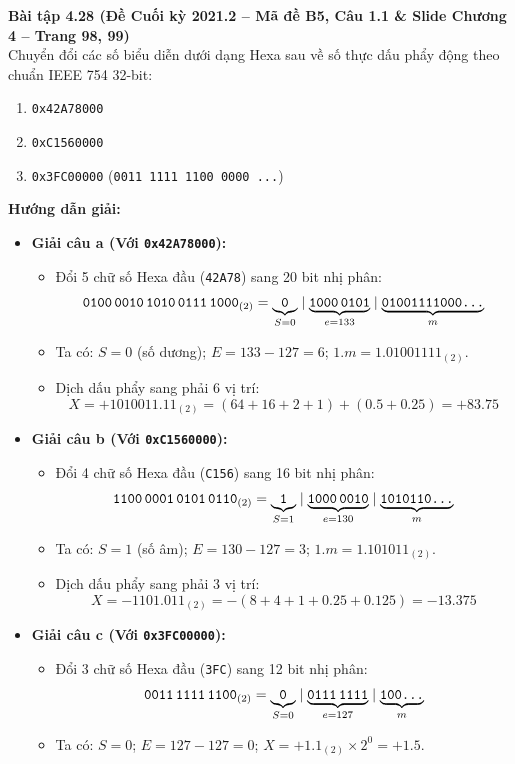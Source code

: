 \textbf{Bài tập 4.28 (Đề Cuối kỳ 2021.2 -- Mã đề B5, Câu 1.1 \& Slide Chương 4 -- Trang 98, 99)}\\
Chuyển đổi các số biểu diễn dưới dạng Hexa sau về số thực dấu phẩy động theo chuẩn IEEE 754 32-bit:
\begin{enumerate}[label=\alph*)]
    \item \texttt{0x42A78000}
    \item \texttt{0xC1560000}
    \item \texttt{0x3FC00000} (\texttt{0011 1111 1100 0000 ...})
\end{enumerate}
\textbf{Hướng dẫn giải:}
\begin{itemize}
    \item \textbf{Giải câu a (Với \texttt{0x42A78000}):}
    \begin{itemize}
        \item Đổi 5 chữ số Hexa đầu (\texttt{42A78}) sang 20 bit nhị phân:
        $$\texttt{0100\,0010\,1010\,0111\,1000}_{(2)} = \underbrace{\texttt{0}}_{S=0} \mid \underbrace{\texttt{1000\,0101}}_{e=133} \mid \underbrace{\texttt{01001111000\dots}}_{m}$$
        \item Ta có: $S = 0$ (số dương); $E = 133 - 127 = 6$; $1.m = 1.01001111_{(2)}$.
        \item Dịch dấu phẩy sang phải $6$ vị trí:
        $$X = +1010011.11_{(2)} = (64 + 16 + 2 + 1) + (0.5 + 0.25) = \mathbf{+83.75}$$
    \end{itemize}
    \item \textbf{Giải câu b (Với \texttt{0xC1560000}):}
    \begin{itemize}
        \item Đổi 4 chữ số Hexa đầu (\texttt{C156}) sang 16 bit nhị phân:
        $$\texttt{1100\,0001\,0101\,0110}_{(2)} = \underbrace{\texttt{1}}_{S=1} \mid \underbrace{\texttt{1000\,0010}}_{e=130} \mid \underbrace{\texttt{1010110\dots}}_{m}$$
        \item Ta có: $S = 1$ (số âm); $E = 130 - 127 = 3$; $1.m = 1.101011_{(2)}$.
        \item Dịch dấu phẩy sang phải $3$ vị trí:
        $$X = -1101.011_{(2)} = -(8 + 4 + 1 + 0.25 + 0.125) = \mathbf{-13.375}$$
    \end{itemize}
    \item \textbf{Giải câu c (Với \texttt{0x3FC00000}):}
    \begin{itemize}
        \item Đổi 3 chữ số Hexa đầu (\texttt{3FC}) sang 12 bit nhị phân:
        $$\texttt{0011\,1111\,1100}_{(2)} = \underbrace{\texttt{0}}_{S=0} \mid \underbrace{\texttt{0111\,1111}}_{e=127} \mid \underbrace{\texttt{100\dots}}_{m}$$
        \item Ta có: $S = 0$; $E = 127 - 127 = 0$; $X = +1.1_{(2)} \times 2^0 = \mathbf{+1.5}$.
    \end{itemize}
\end{itemize}

